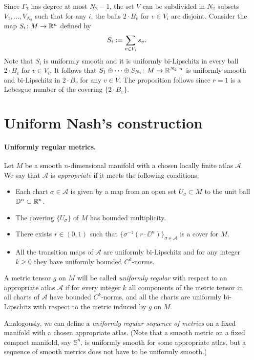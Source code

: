 \documentclass[a4paper,10pt]{article}
\begin{document}
Since $\Gamma_2$ has degree at most $N_2-1$,
the set $V$ can be subdivided in $N_2$ subsets $V_1,\dots, V_{N_2}$ such that 
for any $i$, the balls $2\cdot B_v$ for $v\in V_i$ are disjoint.
Consider the map $S_i\colon M\to\mathbb{R}^n$ defined by
\[S_i\mathrel{{:}{=}}\sum_{v\in V_i}s_v.\]
Note that $S_i$ is uniformly smooth and it is uniformly bi-Lipschitz in every ball $2\cdot B_v$ for $v\in V_i$.
It follows that $S_1\oplus\dots\oplus S_{N_2}\:M\to \RR^{N_2\cdot n}$ is uniformly smooth and bi-Lipschitz in  $2\cdot B_v$ for any $v\in V$.
The proposition follows since $r=1$ is a Lebesgue number of the covering $\{2\cdot B_v\}$.
\qeds

\section*{Uniform Nash's construction}

\paragraph{Uniformly regular metrics.}
\label{par:uniformly-regular}
Let $M$ be a smooth $n$-dimensional manifold with a chosen locally finite atlas $\mathcal{A}$.
We say that $\mathcal{A}$ is \emph{appropriate} if it meets the following conditions:
\begin{itemize}
\item Each chart $\sigma\in \mathcal{A}$ is given by a map from an open set $U_\sigma\subset M$ to the unit ball $\mathbb{D}^n\subset \mathbb{R}^n$.
\item The covering $\{U_\sigma\}$ of $M$ has bounded multiplicity.
\item There exists $r\in (0,1)$ such that $\{\sigma^{-1}(r\cdot \DD^n)\}_{\sigma\in\mathcal{A}}$ is a cover for $M$.
\item All the transition maps of $\mathcal{A}$ are uniformly bi-Lipschitz and for any integer $k\ge 0$ they  have uniformly bounded $C^k$-norms. 
\end{itemize}

A metric tensor $g$ on $M$ will be called \emph{uniformly regular} with respect to an appropriate atlas $\mathcal{A}$
if for every integer $k$ all components of the metric tensor in all charts of $\mathcal{A}$ have bounded $C^k$-norms,
and all the charts are uniformly bi-Lipschitz with respect to the metric induced by $g$ on $M$. 

Analogously, we can define a \emph{uniformly regular sequence of metrics} on a fixed manifold with a chosen appropriate atlas.
(Note that a smooth metric on a fixed compact manifold, say $\mathbb{S}^n$, is uniformly smooth for some appropriate atlas,
but a sequence of smooth metrics does not have to be uniformly smooth.)
\end{document}
